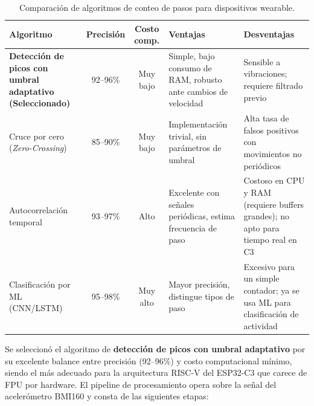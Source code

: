 \documentclass[letterpaper,11pt]{article}
\begin{document}
\begin{table}[H]
    \centering
    \renewcommand{\arraystretch}{1.3}
    \begin{tabular}{|L{3cm}|c|c|L{4cm}|L{4cm}|}
        \hline
        \textbf{Algoritmo}                        & \textbf{Precisión} & \textbf{Costo comp.} & \textbf{Ventajas}                                                  & \textbf{Desventajas}                                                           \\ \hline
        \textbf{Detección de picos con umbral adaptativo (Seleccionado)} & 92--96\%           & Muy bajo             & Simple, bajo consumo de RAM, robusto ante cambios de velocidad     & Sensible a vibraciones; requiere filtrado previo                               \\ \hline
        Cruce por cero (\textit{Zero-Crossing})   & 85--90\%           & Muy bajo             & Implementación trivial, sin parámetros de umbral                   & Alta tasa de falsos positivos con movimientos no periódicos                    \\ \hline
        Autocorrelación temporal                  & 93--97\%           & Alto                 & Excelente con señales periódicas, estima frecuencia de paso        & Costoso en CPU y RAM (requiere buffers grandes); no apto para tiempo real en C3 \\ \hline
        Clasificación por ML (CNN/LSTM)           & 95--98\%           & Muy alto             & Mayor precisión, distingue tipos de paso                           & Excesivo para un simple contador; ya se usa ML para clasificación de actividad  \\ \hline
    \end{tabular}
    \caption{Comparación de algoritmos de conteo de pasos para dispositivos wearable.}
    \label{tab:step_algos}
\end{table}

Se seleccionó el algoritmo de \textbf{detección de picos con umbral adaptativo} por su excelente balance entre precisión (92--96\%) y costo computacional mínimo, siendo el más adecuado para la arquitectura RISC-V del ESP32-C3 \citep{esp32c3_ds} que carece de FPU por hardware. El pipeline de procesamiento opera sobre la señal del acelerómetro BMI160 \citep{bmi160_ds} y consta de las siguientes etapas:
\end{document}
